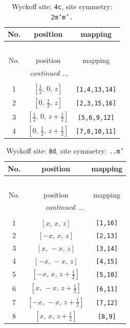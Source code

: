 \documentclass[fleqn,8pt]{jsarticle}
\begin{document}
\renewcommand{\arraystretch}{1.2}
\begin{longtable}{ccc}
\caption{Wyckoff site: {\tt 4c}, site symmetry: {\tt 2m'm'.}}
 \\
 \hline \hline
No. & position & mapping \\ \hline \endfirsthead

\multicolumn{2}{l}{\tablename\ \thetable{}} \\
 \hline \hline
No. & position & mapping \\ \hline \endhead

 \hline \hline
\multicolumn{2}{r}{\footnotesize\it continued ...} \\ \endfoot

 \hline \hline
\multicolumn{2}{r}{} \\ \endlastfoot

1 & $\left[ \frac{1}{2},\, 0,\, z \right]$ & {\tt [1,4,13,14]} \\ \hline
2 & $\left[ 0,\, \frac{1}{2},\, z \right]$ & {\tt [2,3,15,16]} \\ \hline
3 & $\left[ \frac{1}{2},\, 0,\, z + \frac{1}{2} \right]$ & {\tt [5,6,9,12]} \\ \hline
4 & $\left[ 0,\, \frac{1}{2},\, z + \frac{1}{2} \right]$ & {\tt [7,8,10,11]} \\
\end{longtable}
\renewcommand{\arraystretch}{1.2}
\begin{longtable}{ccc}
\caption{Wyckoff site: {\tt 8d}, site symmetry: {\tt ..m'}}
 \\
 \hline \hline
No. & position & mapping \\ \hline \endfirsthead

\multicolumn{2}{l}{\tablename\ \thetable{}} \\
 \hline \hline
No. & position & mapping \\ \hline \endhead

 \hline \hline
\multicolumn{2}{r}{\footnotesize\it continued ...} \\ \endfoot

 \hline \hline
\multicolumn{2}{r}{} \\ \endlastfoot

1 & $\left[ x,\, x,\, z \right]$ & {\tt [1,16]} \\ \hline
2 & $\left[ - x,\, x,\, z \right]$ & {\tt [2,13]} \\ \hline
3 & $\left[ x,\, - x,\, z \right]$ & {\tt [3,14]} \\ \hline
4 & $\left[ - x,\, - x,\, z \right]$ & {\tt [4,15]} \\ \hline
5 & $\left[ - x,\, x,\, z + \frac{1}{2} \right]$ & {\tt [5,10]} \\ \hline
6 & $\left[ x,\, - x,\, z + \frac{1}{2} \right]$ & {\tt [6,11]} \\ \hline
7 & $\left[ - x,\, - x,\, z + \frac{1}{2} \right]$ & {\tt [7,12]} \\ \hline
8 & $\left[ x,\, x,\, z + \frac{1}{2} \right]$ & {\tt [8,9]} \\
\end{longtable}
\end{document}
